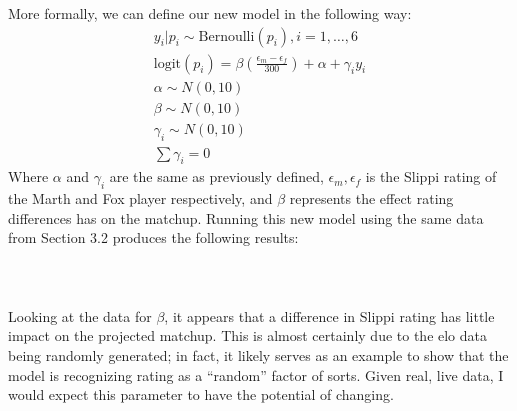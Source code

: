 More formally, we can define our new model in the following way:
\begin{align*}
    y_i|p_i\sim\text{Bernoulli}(p_i), i=1,\dots,6\\
    \text{logit}(p_i) = \beta(\frac{\epsilon_m-\epsilon_f}{300})+\alpha+\gamma_iy_i\\
    \alpha\sim N(0, 10)\\
    \beta\sim N(0, 10)\\
    \gamma_i\sim N(0, 10)\\
    \sum\gamma_i = 0
\end{align*}
Where $\alpha$ and $\gamma_i$ are the same as previously defined, $\epsilon_m,\epsilon_f$ is the Slippi rating of the Marth and Fox player respectively, and $\beta$ represents the effect rating differences has on the matchup. Running this new model using the same data from Section 3.2 produces the following results:
\\\\
\\\\
Looking at the data for $\beta$, it appears that a difference in Slippi rating has little impact on the projected matchup. This is almost certainly due to the elo data being randomly generated; in fact, it likely serves as an example to show that the model is recognizing rating as a ``random'' factor of sorts. Given real, live data, I would expect this parameter to have the potential of changing.

